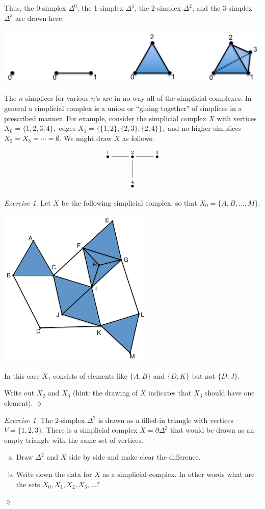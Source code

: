 \documentclass{book}
\newcommand{\LMO}[1]{\stackrel{#1}{\bullet}}
\theoremstyle{remark}
\newtheorem{exc}[subsubsection]{Exercise}
\newenvironment{exercise}{\begin{exc}}{\hspace*{\fill}$\lozenge$\end{exc}}
\theoremstyle{definition}
\def\sexc{\begin{enumerate}[a.)]\setlength{\itemsep}{.1cm}\setlength{\parskip}{.1cm}\item}
\def\next{\item}
\def\endsexc{\end{enumerate}}
\begin{document}
Thus, the 0-simplex $\Delta^0$, the 1-simplex $\Delta^1$, the 2-simplex $\Delta^2$, and the 3-simplex $\Delta^3$ are drawn here:
\begin{center}
\includegraphics[height=1.1in]{simplices}
\end{center} 

The $n$-simplices for various $n$'s are in no way all of the simplicial complexes. In general a simplicial complex is a union or ``gluing together" of simplices in a prescribed manner. For example, consider the simplicial complex $X$ with vertices $X_0=\{1,2,3,4\},$ edges $X_1=\{\{1,2\},\{2,3\},\{2,4\}\},$ and no higher simplices $X_2=X_3=\cdots=\emptyset$. We might draw $X$ as follows:
$$\xymatrix{\LMO{1}\ar@{-}[r]&\LMO{2}\ar@{-}[r]\ar@{-}[d]&\LMO{3}\\&\LMO{4}}$$

\begin{exercise}
Let $X$ be the following simplicial complex, so that $X_0=\{A,B,\ldots,M\}$. 
\begin{center}
\includegraphics[height=3in]{OlogNetwork5}
\end{center} 
In this case $X_1$ consists of elements like $\{A,B\}$ and $\{D,K\}$ but not $\{D,J\}$. 

Write out $X_2$ and $X_3$ (hint: the drawing of $X$ indicates that $X_3$ should have one element).
\end{exercise}

\begin{exercise}
The 2-simplex $\Delta^2$ is drawn as a filled-in triangle with vertices $V=\{1,2,3\}$. There is a simplicial complex $X=\partial\Delta^2$ that would be drawn as an empty triangle with the same set of vertices. 
\sexc Draw $\Delta^2$ and $X$ side by side and make clear the difference.
\next Write down the data for $X$ as a simplicial complex. In other words what are the sets $X_0, X_1, X_2, X_3,\ldots$?
\endsexc
\end{exercise}
\end{document}
